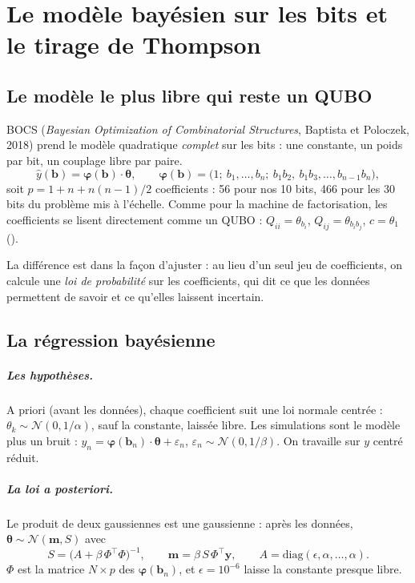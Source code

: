 \chapter{Le modèle bayésien sur les bits et le tirage de Thompson}\label{ch:bocs}

\section{Le modèle le plus libre qui reste un QUBO}
BOCS (\emph{Bayesian Optimization of Combinatorial Structures}, Baptista et Poloczek, 2018) prend le modèle quadratique \emph{complet} sur les bits : une constante, un poids par bit, un couplage libre par paire.
\[ \hat y(\mathbf b)=\boldsymbol\varphi(\mathbf b)\cdot\boldsymbol\theta,\qquad\boldsymbol\varphi(\mathbf b)=\big(1;\ b_1,\dots,b_n;\ b_1b_2,\ b_1b_3,\dots,b_{n-1}b_n\big), \]
soit $p=1+n+n(n-1)/2$ coefficients : 56 pour nos 10 bits, 466 pour les 30 bits du problème mis à l'échelle. Comme pour la machine de factorisation, les coefficients se lisent directement comme un QUBO : $Q_{ii}=\theta_{b_i}$, $Q_{ij}=\theta_{b_ib_j}$, $c=\theta_1$ ().

La différence est dans la façon d'ajuster : au lieu d'un seul jeu de coefficients, on calcule une \emph{loi de probabilité} sur les coefficients, qui dit ce que les données permettent de savoir et ce qu'elles laissent incertain.

\section{La régression bayésienne}
\paragraph{Les hypothèses.} A priori (avant les données), chaque coefficient suit une loi normale centrée : $\theta_k\sim\mathcal N(0,1/\alpha)$, sauf la constante, laissée libre. Les simulations sont le modèle plus un bruit : $y_n=\boldsymbol\varphi(\mathbf b_n)\cdot\boldsymbol\theta+\varepsilon_n$, $\varepsilon_n\sim\mathcal N(0,1/\beta)$. On travaille sur $y$ centré réduit.

\paragraph{La loi a posteriori.} Le produit de deux gaussiennes est une gaussienne : après les données, $\boldsymbol\theta\sim\mathcal N(\mathbf m,S)$ avec
\[ S=\big(A+\beta\,\Phi^\top\Phi\big)^{-1},\qquad\mathbf m=\beta\,S\,\Phi^\top\mathbf y,\qquad A=\mathrm{diag}(\epsilon,\alpha,\dots,\alpha). \]
$\Phi$ est la matrice $N\times p$ des $\boldsymbol\varphi(\mathbf b_n)$, et $\epsilon=10^{-6}$ laisse la constante presque libre.

